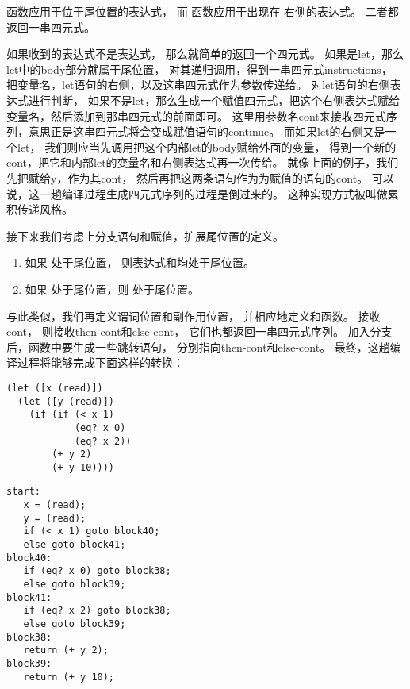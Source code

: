 函数应用于位于尾位置的表达式，
而 函数应用于出现在  右侧的表达式。
二者都返回一串四元式。

如果收到的表达式不是表达式，
那么就简单的返回一个四元式。
如果是let，那么let中的body部分就属于尾位置，
对其递归调用，得到一串四元式instructions，
把变量名，let语句的右侧，以及这串四元式作为参数传递给。
对let语句的右侧表达式进行判断，
如果不是let，那么生成一个赋值四元式，把这个右侧表达式赋给变量名，然后添加到那串四元式的前面即可。
这里用参数名cont来接收四元式序列，意思正是这串四元式将会变成赋值语句的continue。
而如果let的右侧又是一个let，
我们则应当先调用把这个内部let的body赋给外面的变量，
得到一个新的cont，把它和内部let的变量名和右侧表达式再一次传给。
就像上面的例子，我们先把赋给y，作为其cont，
然后再把这两条语句作为为赋值的语句的cont。
可以说，这一趟编译过程生成四元式序列的过程是倒过来的。
这种实现方式被叫做累积传递风格。

接下来我们考虑上分支语句和赋值，扩展尾位置的定义。
\begin{enumerate}
\item 如果  处于尾位置，
  则表达式和均处于尾位置。
\item 如果 处于尾位置，则 处于尾位置。
\end{enumerate}

与此类似，我们再定义谓词位置和副作用位置，
并相应地定义和函数。
接收cont，
则接收then-cont和else-cont，
它们也都返回一串四元式序列。
加入分支后，函数中要生成一些跳转语句，
分别指向then-cont和else-cont。
最终，这趟编译过程将能够完成下面这样的转换：

\begin{transformation}
\begin{lstlisting}
(let ([x (read)])
  (let ([y (read)])
    (if (if (< x 1)
            (eq? x 0)
            (eq? x 2))
        (+ y 2)
        (+ y 10))))
\end{lstlisting}
\compilesto
\begin{lstlisting}
start:
   x = (read);
   y = (read);
   if (< x 1) goto block40;
   else goto block41;
block40:
   if (eq? x 0) goto block38;
   else goto block39;
block41:
   if (eq? x 2) goto block38;
   else goto block39;
block38:
   return (+ y 2);
block39:
   return (+ y 10);
\end{lstlisting}
\end{transformation}
